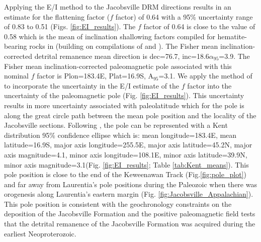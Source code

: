 Applying the E/I method to the Jacobsville DRM directions results in an estimate for the flattening factor ($f$ factor) of 0.64 with a 95\% uncertainty range of 0.83 to 0.51 (Figs. \ref{fig:EI_results}). The $f$ factor of 0.64 is close to the value of 0.58 which is the mean of inclination shallowing factors compiled for hematite-bearing rocks in \cite{Pierce2022a} (building on compilations of \cite{Bilardello2016b} and \cite{Vaes2021a}). The Fisher mean inclination-corrected detrital remanence mean direction is dec=76.7\textdegree, inc=18.6\textdegree $\alpha_{95}$=3.9\textdegree. The Fisher mean inclination-corrected paleomagnetic pole associated with this nominal $f$ factor is Plon=183.4\textdegree E, Plat=16.9\textdegree S, A$_{95}$=3.1\textdegree. We apply the method of \cite{Pierce2022a} to incorporate the uncertainty in the E/I estimate of the $f$ factor into the uncertainty of the paleomagnetic pole (Fig. \ref{fig:EI_results}). This uncertainty results in more uncertainty associated with paleolatitude which for the pole is along the great circle path between the mean pole position and the locality of the Jacobsville sections. Following \cite{Pierce2022a}, the pole can be represented with a Kent distribution 95\% confidence ellipse which is: mean longitude=183.4\textdegree E, mean latitude=16.9\textdegree S, major axis longitude=255.5\textdegree E, major axis latitude=45.2\textdegree N, major axis magnitude=4.1\textdegree, minor axis longitude=108.1\textdegree E, minor axis latitude=39.9\textdegree N, minor axis magnitude=3.1\textdegree (Fig. \ref{fig:EI_results}; Table \ref{tab:Kent_means}). This pole position is close to the end of the Keweenawan Track (Fig.\ref{fig:pole_plot}) and far away from Laurentia's pole positions during the Paleozoic when there was orogenesis along Laurentia's eastern margin (Fig. \ref{fig:Jacobsville_Appalachian}). This pole position is consistent with the geochronology constraints on the deposition of the Jacobsville Formation and the positive paleomagnetic field tests that the detrital remanence of the Jacobsville Formation was acquired during the earliest Neoproterozoic. 


